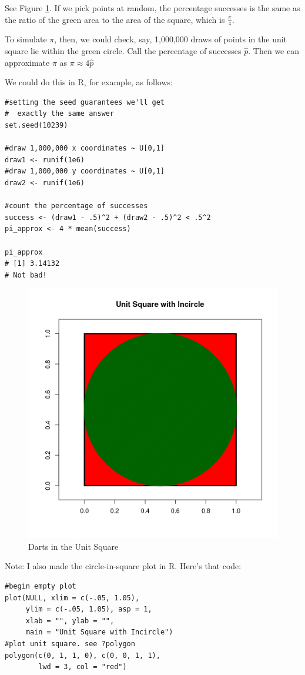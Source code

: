 \documentclass{article}
\newenvironment{solution}{\color{red}}{\color{black}}
\begin{document}
\begin{enumerate}
\begin{solution}
See Figure \ref{fig:circle}. If we pick points at random, the percentage successes is the same as the ratio of the green area to the area of the square, which is $\frac{\pi}4$.

To simulate $\pi$, then, we could check, say, 1,000,000 draws of points in the unit square lie within the green circle. Call the percentage of successes $\hat{p}$. Then we can approximate $\pi$ as $\pi \approx 4\hat{p}$

We could do this in R, for example, as follows:

\begin{lstlisting}
#setting the seed guarantees we'll get
#  exactly the same answer
set.seed(10239)

#draw 1,000,000 x coordinates ~ U[0,1]
draw1 <- runif(1e6)
#draw 1,000,000 y coordinates ~ U[0,1]
draw2 <- runif(1e6)

#count the percentage of successes
success <- (draw1 - .5)^2 + (draw2 - .5)^2 < .5^2
pi_approx <- 4 * mean(success)

pi_approx
# [1] 3.14132
# Not bad!
\end{lstlisting}

\begin{figure}[htbp]
\centering
\caption{Darts in the Unit Square}
\label{fig:circle}
\includegraphics[width = .5\textwidth]{recitation160901_fig2.png}
\end{figure}

Note: I also made the circle-in-square plot in R. Here's that code:

\begin{lstlisting}
#begin empty plot
plot(NULL, xlim = c(-.05, 1.05), 
     ylim = c(-.05, 1.05), asp = 1,
     xlab = "", ylab = "", 
     main = "Unit Square with Incircle")
#plot unit square. see ?polygon
polygon(c(0, 1, 1, 0), c(0, 0, 1, 1), 
        lwd = 3, col = "red")


\end{lstlisting}
\end{solution}
\end{enumerate}
\end{document}
